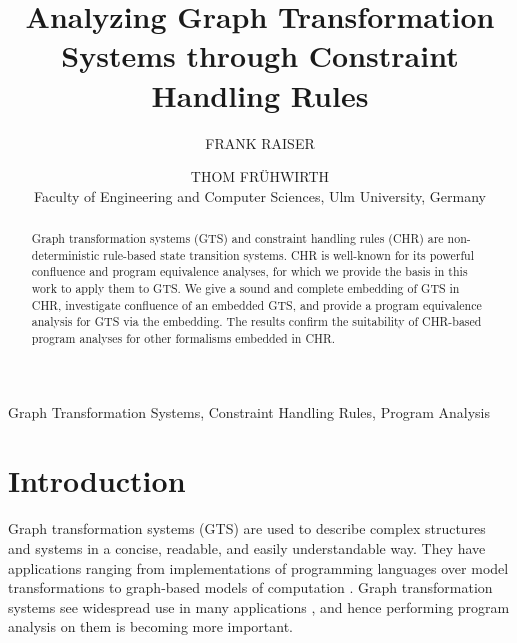 \documentclass{tlp}
\begin{document}
\title{Analyzing Graph Transformation Systems through Constraint Handling Rules}

\author[Frank Raiser, Thom Fr{\"u}hwirth]{FRANK RAISER \and THOM FR{\"U}HWIRTH\\
Faculty of Engineering and Computer Sciences, Ulm University, Germany\\
}

\maketitle 



\begin{abstract}
Graph transformation systems (GTS) and constraint handling rules (CHR) are
non-deterministic rule-based state transition systems. 
CHR is well-known for its powerful confluence and program equivalence analyses,
for which we provide the basis in this work to apply them to GTS.
We give a sound and complete embedding of GTS in CHR, investigate confluence of
an embedded GTS, and provide a program equivalence analysis for GTS via the
embedding.
The results confirm the suitability of CHR-based program analyses for
other formalisms embedded in CHR.
\end{abstract}

\begin{keywords}
Graph Transformation Systems, Constraint Handling Rules, Program Analysis
\end{keywords}

\section{Introduction}
\label{sec:intro}

Graph transformation systems (GTS) are used to describe complex structures and
systems in a concise, readable, and easily understandable way. They have
applications ranging from implementations of programming languages over model
transformations to graph-based models of computation
\cite{Blostein1995,ehrigprangetaentzer06}. Graph transformation systems see
widespread use in many applications \cite{ehrigprangetaentzer06}, and hence
performing program analysis on them is becoming more important.
\end{document}
